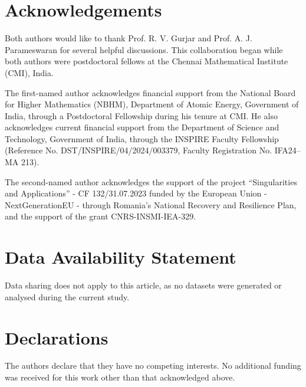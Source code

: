 \documentclass[english,10pt,reqno,twoside]{amsart}
\numberwithin{equation}{section}
\numberwithin{figure}{section}
\theoremstyle{plain}
\theoremstyle{plain}
\theoremstyle{definition}
\theoremstyle{plain}
\numberwithin{equation}{section}
\begin{document}
\section*{\bf Acknowledgements}
Both authors would like to thank Prof. R. V. Gurjar and Prof. A. J. Parameswaran for several helpful discussions. This collaboration began while both authors were postdoctoral fellows at the Chennai Mathematical Institute (CMI), India.

The first-named author acknowledges financial support from the National Board for Higher Mathematics (NBHM), Department of Atomic Energy, Government of India, through a Postdoctoral Fellowship during his tenure at CMI. He also acknowledges current financial support from the Department of Science and Technology, Government of India, through the INSPIRE Faculty Fellowship (Reference No. DST/INSPIRE/04/2024/003379, Faculty Registration No. IFA24--MA 213).

The second-named author acknowledges 
the support of the project 
``Singularities and Applications'' 
- CF 132/31.07.2023 funded by the European Union - NextGenerationEU - through Romania's National Recovery and Resilience Plan, and the support of the grant CNRS-INSMI-IEA-329.


\section*{\bf Data Availability Statement}

Data sharing does not apply to this article, as no datasets were generated or analysed during the current study.

\section*{\bf Declarations}

The authors declare that they have no competing interests. No additional funding was received for this work other than that acknowledged above.



\end{document}
